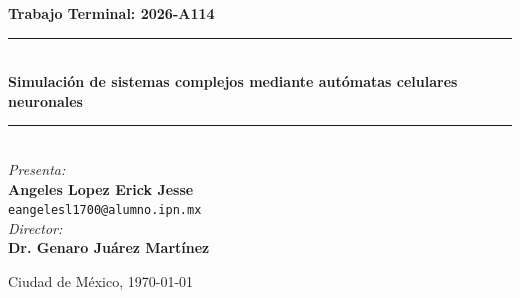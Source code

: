 \begin{center}
	
	{\large \textbf{Trabajo Terminal: 2026-A114}}\\[0.2cm]
	
	\rule{0.6\textwidth}{0.4pt}\\[0.4cm]
	{\LARGE \textbf{Simulación de sistemas complejos mediante autómatas celulares neuronales}}\\
	\rule{0.6\textwidth}{0.4pt}\\[2cm]
	
	{\large \textit{Presenta:}}\\[0.4cm]
	{\large \textbf{Angeles Lopez Erick Jesse}}\\[0.2cm]
	{\small \texttt{eangelesl1700@alumno.ipn.mx}}\\[2cm]
	
	{\large \textit{Director:}}\\[0.4cm]
	{\large \textbf{Dr. Genaro Juárez Martínez}}\\[3cm]
	
	\vfill
	
	{\large Ciudad de México, \today}
	
\end{center}